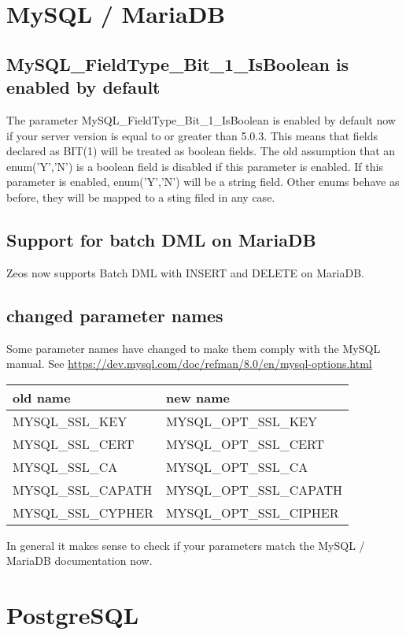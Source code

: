 \documentclass[a4paper,12pt,oneside]{report}
\begin{document}
\section{MySQL / MariaDB}

\subsection{MySQL\_FieldType\_Bit\_1\_IsBoolean is enabled by default}

The parameter MySQL\_FieldType\_Bit\_1\_IsBoolean is enabled by default now if your server version is equal to or greater than 5.0.3.
This means that fields declared as BIT(1) will be treated as boolean fields.
The old assumption that an enum('Y','N') is a boolean field is disabled if this parameter is enabled.
If this parameter is enabled, enum('Y','N') will be a string field.
Other enums behave as before, they will be mapped to a sting filed in any case.

\subsection{Support for batch DML on MariaDB}
Zeos now supports Batch DML with INSERT and DELETE on MariaDB.

\subsection{changed parameter names}
Some parameter names have changed to make them comply with the MySQL manual.
See \url{https://dev.mysql.com/doc/refman/8.0/en/mysql-options.html}

\begin{tabular}{ll}
	old name & new name \\ \hline
  MYSQL\_SSL\_KEY & MYSQL\_OPT\_SSL\_KEY\\
	MYSQL\_SSL\_CERT & MYSQL\_OPT\_SSL\_CERT \\
	MYSQL\_SSL\_CA & MYSQL\_OPT\_SSL\_CA \\
	MYSQL\_SSL\_CAPATH & MYSQL\_OPT\_SSL\_CAPATH \\
	MYSQL\_SSL\_CYPHER & MYSQL\_OPT\_SSL\_CIPHER \\
\end{tabular}

In general it makes sense to check if your parameters match the MySQL / MariaDB documentation now.

\section{PostgreSQL}
\end{document}
